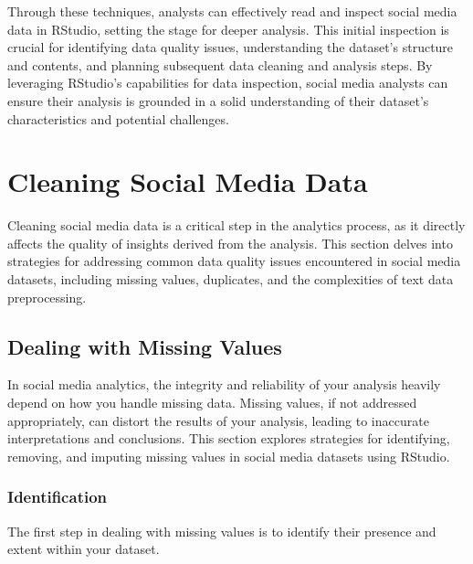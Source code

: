 \documentclass[
]{book}
\begin{document}
Through these techniques, analysts can effectively read and inspect social media data in RStudio, setting the stage for deeper analysis. This initial inspection is crucial for identifying data quality issues, understanding the dataset's structure and contents, and planning subsequent data cleaning and analysis steps. By leveraging RStudio's capabilities for data inspection, social media analysts can ensure their analysis is grounded in a solid understanding of their dataset's characteristics and potential challenges.

\hypertarget{cleaning-social-media-data}{%
\section{Cleaning Social Media Data}\label{cleaning-social-media-data}}

Cleaning social media data is a critical step in the analytics process, as it directly affects the quality of insights derived from the analysis. This section delves into strategies for addressing common data quality issues encountered in social media datasets, including missing values, duplicates, and the complexities of text data preprocessing.

\hypertarget{dealing-with-missing-values}{%
\subsection{Dealing with Missing Values}\label{dealing-with-missing-values}}

In social media analytics, the integrity and reliability of your analysis heavily depend on how you handle missing data. Missing values, if not addressed appropriately, can distort the results of your analysis, leading to inaccurate interpretations and conclusions. This section explores strategies for identifying, removing, and imputing missing values in social media datasets using RStudio.

\hypertarget{identification}{%
\subsubsection{Identification}\label{identification}}

The first step in dealing with missing values is to identify their presence and extent within your dataset.
\end{document}
